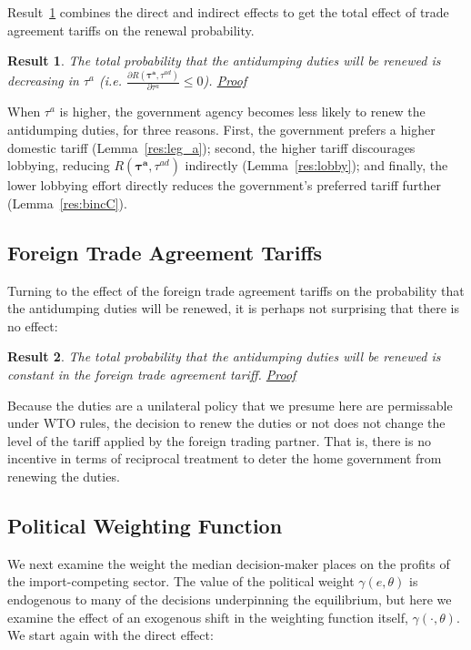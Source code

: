 \documentclass[10pt]{article}
\newtheorem{result}{Result}
\newcommand{\ta}{\theta}
\newcommand{\bta}{\bm{\tau^a}}
\newcommand{\tad}{\tau^{ad}}
\newcommand{\ga}{\gamma}
\begin{document}
Result~\ref{res:bcomB} combines the direct and indirect effects to get the total effect of trade agreement tariffs on the renewal probability.

\begin{result}
	The total probability that the antidumping duties will be renewed is decreasing in $\tau^a$ (i.e. $\frac{\partial R(\bta,\tad)}{\partial  \tau^a} \leq 0$). \hyperlink{Pr_bcomB}{Proof}
	\label{res:bcomB}
\end{result}

\noindent When $\tau^a$ is higher, the government agency becomes less likely to renew the antidumping duties, for three reasons. First, the government prefers a higher domestic tariff (Lemma~\ref{res:leg_a}); second, the higher tariff discourages lobbying, reducing $R(\bta,\tad)$ indirectly (Lemma~\ref{res:lobby}); and finally, the lower lobbying effort directly reduces the government's preferred tariff further (Lemma~\ref{res:bincC}).


\bigskip
\subsection{Foreign Trade Agreement Tariffs}
\label{sec:foreign}

Turning to the effect of the foreign trade agreement tariffs on the probability that the antidumping duties will be renewed, it is perhaps not surprising that there is no effect:
\begin{result}
  The total probability that the antidumping duties will be renewed is constant in the foreign trade agreement tariff. \hyperlink{Pr_astar}{Proof}
  \label{res:leg_astar}
\end{result}

Because the duties are a unilateral policy that we presume here are permissable under WTO rules, the decision to renew the duties or not does not change the level of the tariff applied by the foreign trading partner. That is, there is no incentive in terms of reciprocal treatment to deter the home government from renewing the duties.


\bigskip
\subsection{Political Weighting Function}
\label{sec:gamma}

We next examine the weight the median decision-maker places on the profits of the import-competing sector. The value of the political weight $\ga(e,\ta)$ is endogenous to many of the decisions underpinning the equilibrium, but here we examine the effect of an exogenous shift in the weighting function itself, $\ga(\cdot,\ta)$. We start again with the direct effect:
\end{document}
